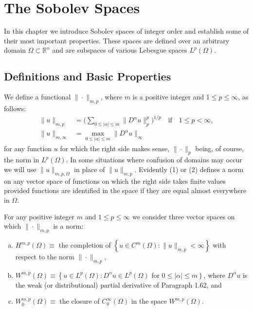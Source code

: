\chapter[The Sobolev Spaces $W^{k,p}(\varOmega)$]%
  {The Sobolev Spaces }

In this chapter we introduce Sobolev spaces of integer order and establish
some of their most important properties. These spaces are defined over an arbitrary
domain $\Omega\subset \mathbb{R}^n$ and are subspaces of various Lebesgue
spaces $L^p(\Omega)$.


\section*{Definitions and Basic Properties}

\begin{para}
  We define a functional $\|\cdot\|_{m,p}$, where $m$
  is a positive integer and $1\leq p\leq \infty$, as follows:
  \begin{align}
    \|u\|_{m,p} & = \biggl(\sum_{0\leq |\alpha|\leq m} \|D^\alpha u\|_p^p\biggr)^{1/p}
      \quad\text{if}\quad 1\leq p<\infty, \\
    \|u\|_{m,\infty} & = \max_{0\leq |\alpha| \leq m} \|D^\alpha u\|_{\infty}
  \end{align}
  for any function $u$ for which the right side makes sense,
  $\|\cdot\|_p$ being, of course, the norm in $L^p(\Omega)$.
  In some situations where confusion of domains may occur
  we will use $\|u\|_{m,p,\Omega}$ in place of $\|u\|_{m,p}$.
  Evidently (1) or (2) defines a norm on 
  any vector space of functions on which the right side takes finite values provided 
  functions are identified in the space if they are equal almost everywhere in $\Omega$.
\end{para}

\begin{para}
  For any positive integer $m$ and $1 \leq p \leq \infty$ we consider three vector spaces 
  on which $\|\cdot\|_{m,p}$ is a norm:
  \begin{enumerate}[(a)]
    \item $H^{m, p}(\Omega) \equiv$ the completion of $\left\{u \in C^m(\Omega):\|u\|_{m,p}<\infty\right\}$ with respect to the norm $\|\cdot\|_{m,p}$,
    \item $W^{m,p}(\Omega) \equiv\left\{u \in L^p(\Omega): D^\alpha u \in L^p(\Omega)\right.$ for $\left.0 \leq|\alpha| \leq m\right\}$, where $D^\alpha u$ is the weak (or distributional) partial derivative of Paragraph 1.62, and
    \item $W_0^{m, p}(\Omega) \equiv$ the closure of $C_0^{\infty}(\Omega)$ in the space $W^{m,p}(\Omega)$.
  \end{enumerate}
\end{para}

